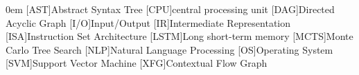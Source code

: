 \begin{acronym}[LSTM]\itemsep0em
    [AST]{Abstract Syntax Tree}
    [CPU]{central processing unit}
    [DAG]{Directed Acyclic Graph}
    [I/O]{Input/Output}
    [IR]{Intermediate Representation}
    [ISA]{Instruction Set Architecture}
    [LSTM]{Long short-term memory}
    [MCTS]{Monte Carlo Tree Search}
    [NLP]{Natural Language Processing}
    [OS]{Operating System}
    [SVM]{Support Vector Machine}
    [XFG]{Contextual Flow Graph}
\end{acronym}
